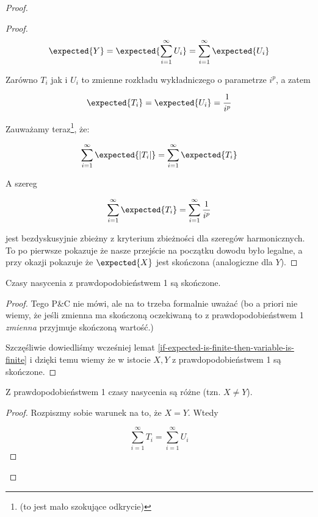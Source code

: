 \begin{proof}
\begin{proof}
        \[ 
            \expected{Y} = \expected{\sum_{i=1}^{\infty} U_i} = \sum_{i=1}^{\infty} \expected{U_i}
        \]
        
        Zarówno \(T_i\) jak i \(U_i\) to zmienne rozkładu wykładniczego o parametrze \(i^p\), a zatem 
        
        \[ 
            \expected{T_i} = \expected{U_i} = \frac{1}{i^p}
        \]
        
        Zauważamy teraz\footnote{(to jest mało szokujące odkrycie)}, że:
        
        \[
            \sum_{i=1}^{\infty} \expected{|T_i| } =  \sum_{i=1}^{\infty} \expected{T_i}
        \]
        
        A szereg 
        
        \[
             \sum_{i=1}^{\infty} \expected{T_i} = \sum_{i=1}^{\infty} \frac{1}{i^p}
        \]
        
        jest bezdyskusyjnie zbieżny z kryterium zbieżności dla szeregów harmonicznych. To po pierwsze pokazuje że nasze przejście na początku dowodu było legalne, a przy okazji pokazuje że \( \expected{X}\) jest skończona (analogiczne dla \(Y\)). 
        
    \end{proof}

    \begin{lemma}
        Czasy nasycenia z prawdopodobieństwem 1 są skończone.
    \end{lemma}
    \begin{proof}
            Tego P\&C nie mówi, ale na to trzeba formalnie uważać (bo a priori nie wiemy, że jeśli zmienna ma skończoną oczekiwaną to z prawdopodobieństwem 1 \textit{zmienna} przyjmuje skończoną wartość.)
            
            Szczęśliwie dowiedliśmy wcześniej lemat \ref{if-expected-is-finite-then-variable-is-finite} i dzięki temu wiemy że w istocie \(X, Y\) z prawdopodobieństwem 1 są skończone.
    \end{proof}
    
    \begin{lemma}
        Z prawdopodobieństwem 1 czasy nasycenia są różne (tzn. \(X \not = Y\)). 
    \end{lemma}
    \begin{proof}
        Rozpiszmy sobie warunek na to, że \(X = Y\). Wtedy
        
         \[
        \sum_{i=1}^{\infty} T_i = \sum_{i=1}^{\infty} U_i
        \]
        

\end{proof}
\end{proof}
